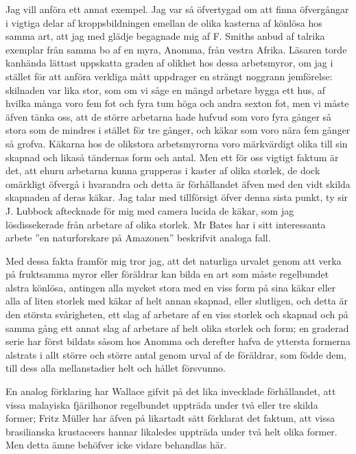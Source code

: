 Jag vill anföra ett annat exempel. Jag var så öfvertygad om att finna öfvergångar i vigtiga delar af kroppsbildningen emellan de olika kasterna af könlösa hos samma art, att jag med glädje begagnade mig af F. Smiths anbud af talrika exemplar från samma bo af en myra, Anomma, från vestra Afrika. Läsaren torde kanhända lättast uppskatta graden af olikhet hos dessa arbetsmyror, om jag i stället för att anföra verkliga mått uppdrager en strängt noggrann jemförelse: skilnaden var lika stor, som om vi såge en mängd arbetare bygga ett hus, af hvilka många voro fem fot och fyra tum höga och andra sexton fot, men vi måste äfven tänka oss, att de större arbetarna hade hufvud som voro fyra gånger så stora som de mindres i stället för tre gånger, och käkar som voro nära fem gånger så grofva. Käkarna hos de olikstora arbetsmyrorna voro märkvärdigt olika till sin skapnad och likaså tändernas form och antal. Men ett för oss vigtigt faktum är det, att ehuru arbetarna kunna grupperas i kaster af olika storlek, de dock omärkligt öfvergå i hvarandra och detta är förhållandet äfven med den vidt skilda skapnaden af deras käkar. Jag talar med tillförsigt öfver denna sista punkt, ty sir J. Lubbock aftecknade för mig med camera lucida de käkar, som jag lösdissekerade från arbetare af olika storlek. Mr Bates har i sitt interessanta arbete ”en naturforskare på Amazonen” beskrifvit analoga fall.

Med dessa fakta framför mig tror jag, att det naturliga urvalet genom att verka på fruktsamma myror eller föräldrar kan bilda en art som måste regelbundet alstra könlösa, antingen alla mycket stora med en viss form på sina käkar eller alla af liten storlek med käkar af helt annan skapnad, eller slutligen, och detta är den största svårigheten, ett slag af arbetare af en viss storlek och skapnad och på samma gång ett annat slag af arbetare af helt olika storlek och form; en graderad serie har först bildats såsom hos Anomma och derefter hafva de yttersta formerna alstrats i allt större och större antal genom urval af de föräldrar, som födde dem, till dess alla mellanstadier helt och hållet försvunno.

En analog förklaring har Wallace gifvit på det lika invecklade förhållandet, att vissa malayiska fjärilhonor regelbundet uppträda under två eller tre skilda former; Fritz Müller har äfven på likartadt sätt förklarat det faktum, att vissa brasilianska krustaceers hannar likaledes uppträda under två helt olika former. Men detta ämne behöfver icke vidare behandlas här.

